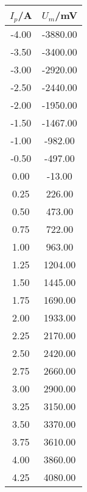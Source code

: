 \begin{norma;}\begin{tabular}{|c|c|}
\hline
\textbf{$I_p$/A}&\textbf{$U_m$/mV}\\\hline
-4.00&-3880.00\\\hline
-3.50&-3400.00\\\hline
-3.00&-2920.00\\\hline
-2.50&-2440.00\\\hline
-2.00&-1950.00\\\hline
-1.50&-1467.00\\\hline
-1.00&-982.00\\\hline
-0.50&-497.00\\\hline
0.00&-13.00\\\hline
0.25&226.00\\\hline
0.50&473.00\\\hline
0.75&722.00\\\hline
1.00&963.00\\\hline
1.25&1204.00\\\hline
1.50&1445.00\\\hline
1.75&1690.00\\\hline
2.00&1933.00\\\hline
2.25&2170.00\\\hline
2.50&2420.00\\\hline
2.75&2660.00\\\hline
3.00&2900.00\\\hline
3.25&3150.00\\\hline
3.50&3370.00\\\hline
3.75&3610.00\\\hline
4.00&3860.00\\\hline
4.25&4080.00\\\hline
\end{tabular}
\end{norma;}